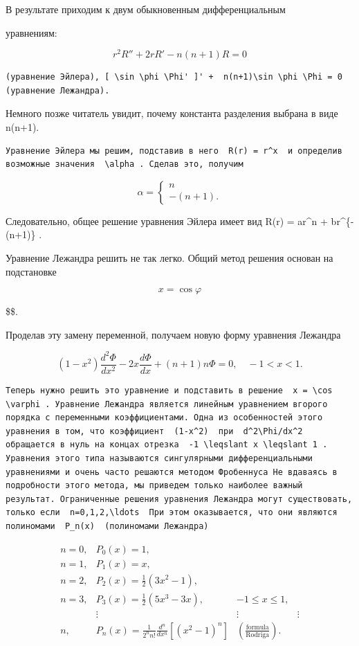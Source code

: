 \documentclass[
  ukrainian,
]{article}
\begin{document}
В результате приходим к двум обыкновенным дифференциальным

уравнениям:

\[
r^2R'' + 2rR' - n(n+1)R = 0
\]

\begin{verbatim}
(уравнение Эйлера), [ \sin \phi \Phi' ]' +  n(n+1)\sin \phi \Phi = 0  (уравнение Лежандра).
\end{verbatim}

Немного позже читатель увидит, почему константа разделения выбрана в
виде n(n+1).

\begin{verbatim}
Уравнение Эйлера мы решим, подставив в него  R(r) = r^x  и определив возможные значения  \alpha . Сделав это, получим
\end{verbatim}

\[
\alpha = \begin{cases} n \\ -(n+1). \end{cases}
\]

Следовательно, общее решение уравнения Эйлера имеет вид R(r) = ar\^{}n +
br\^{}\{-(n+1)\} .

Уравнение Лежандра решить не так легко. Общий метод решения основан на
подстановке

\[
x = \cos \varphi
\]

\$\$.

Проделав эту замену переменной, получаем новую форму уравнения Лежандра

\[
(1-x^2)\frac{d^2\Phi}{dx^2} - 2x\frac{d\Phi}{dx} + (n+1)n\Phi = 0, \quad -1 < x < 1.
\]

\begin{verbatim}
Теперь нужно решить это уравнение и подставить в решение  x = \cos \varphi . Уравнение Лежандра является линейным уравнением вгорого порядка с переменными коэффициентами. Одна из особенностей этого уравнения в том, что коэффициент  (1-x^2)  при  d^2\Phi/dx^2  обращается в нуль на концах отрезка  -1 \leqslant x \leqslant 1 . Уравнения этого типа называются сингулярными дифференциальными уравнениями и очень часто решаются методом Фробеннуса Не вдаваясь в подробности этого метода, мы приведем только наиболее важный результат. Ограниченные решения уравнения Лежандра могут существовать, только если  n=0,1,2,\ldots  При этом оказывается, что они являются полиномами  P_n(x)  (полиномами Лежандра)
\end{verbatim}

\[
\begin{array}{lll} n=0, & P_{0}(x)=1, \\ n=1, & P_{1}(x)=x, \\ n=2, & P_{2}(x)=\frac{1}{2}(3x^{2}-1), \\ n=3, & P_{3}(x)=\frac{1}{2}(5x^{3}-3x), & -1\leqslant x\leqslant 1, \\ & \vdots & \vdots & \vdots \\ n, & P_{n}(x)=\frac{1}{2^{n}n!}\frac{d^{n}}{dx^{n}}[(x^{2}-1)^{n}] & \left(\frac{\text{formula}}{\text{Rodriga}}\right). \end{array}
\]
\end{document}
